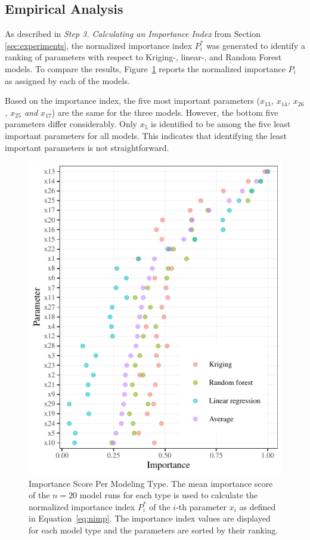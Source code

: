 \documentclass[conference]{IEEEtran}
\begin{document}
\subsection{Empirical Analysis}
As described in \emph{Step 3. Calculating an Importance Index} from Section \ref{sec:experiments}, 
the normalized importance index $P^{\ast}_i$ was generated to identify a ranking of parameters with respect to Kriging-, linear-, and Random Forest models.
To compare the results, Figure~\ref{fig:importanceByType} reports the normalized importance $P_{i}$ as assigned by each of the models.

Based on the importance index, the five most important parameters (\emph{$x_{13}$, $x_{14}$, $x_{26}$, $x_{25}$ and $x_{17}$}) are the same for the three models. However, the bottom five parameters differ considerably. Only \emph{$x_{5}$} is identified to be among the five least important  parameters for all models. 
This indicates that identifying the least important parameters is not straightforward.

\begin{figure}
  \centering
  \includegraphics{variable_importance.pdf}
  \caption{Importance Score Per Modeling Type. The mean importance score of the $n=20$ model runs for each type is used to calculate the normalized importance index $P^{\ast}_i$ of the $i$-th parameter $x_i$ as defined in Equation~\ref{eq:nimp}. The importance index values are displayed for each model type and the parameters are sorted by their ranking.}
\label{fig:importanceByType}
\end{figure}
\end{document}
